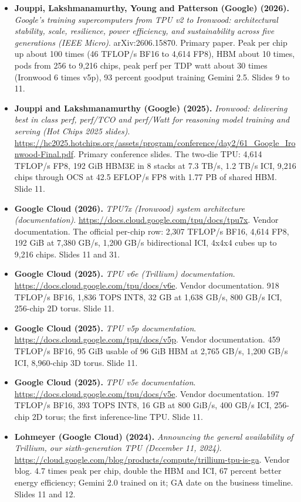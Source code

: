 \documentclass[11pt,letterpaper]{article}
\begin{document}
\begin{itemize}[leftmargin=1.2em,itemsep=3pt]
\item \textbf{Jouppi, Lakshmanamurthy, Young and Patterson (Google) (2026).} \textit{Google's training supercomputers from TPU v2 to Ironwood: architectural stability, scale, resilience, power efficiency, and sustainability across five generations (IEEE Micro)}. arXiv:2606.15870. Primary paper. Peak per chip up about 100 times (46 TFLOP/s BF16 to 4,614 FP8), HBM about 10 times, pods from 256 to 9,216 chips, peak perf per TDP watt about 30 times (Ironwood 6 times v5p), 93 percent goodput training Gemini 2.5. Slides 9 to 11.
\item \textbf{Jouppi and Lakshmanamurthy (Google) (2025).} \textit{Ironwood: delivering best in class perf, perf/TCO and perf/Watt for reasoning model training and serving (Hot Chips 2025 slides)}. \url{https://hc2025.hotchips.org/assets/program/conference/day2/61_Google_Ironwood-Final.pdf}. Primary conference slides. The two-die TPU: 4,614 TFLOP/s FP8, 192 GiB HBM3E in 8 stacks at 7.3 TB/s, 1.2 TB/s ICI, 9,216 chips through OCS at 42.5 EFLOP/s FP8 with 1.77 PB of shared HBM. Slide 11.
\item \textbf{Google Cloud (2026).} \textit{TPU7x (Ironwood) system architecture (documentation)}. \url{https://docs.cloud.google.com/tpu/docs/tpu7x}. Vendor documentation. The official per-chip row: 2,307 TFLOP/s BF16, 4,614 FP8, 192 GiB at 7,380 GB/s, 1,200 GB/s bidirectional ICI, 4x4x4 cubes up to 9,216 chips. Slides 11 and 31.
\item \textbf{Google Cloud (2025).} \textit{TPU v6e (Trillium) documentation}. \url{https://docs.cloud.google.com/tpu/docs/v6e}. Vendor documentation. 918 TFLOP/s BF16, 1,836 TOPS INT8, 32 GB at 1,638 GB/s, 800 GB/s ICI, 256-chip 2D torus. Slide 11.
\item \textbf{Google Cloud (2025).} \textit{TPU v5p documentation}. \url{https://docs.cloud.google.com/tpu/docs/v5p}. Vendor documentation. 459 TFLOP/s BF16, 95 GiB usable of 96 GiB HBM at 2,765 GB/s, 1,200 GB/s ICI, 8,960-chip 3D torus. Slide 11.
\item \textbf{Google Cloud (2025).} \textit{TPU v5e documentation}. \url{https://docs.cloud.google.com/tpu/docs/v5e}. Vendor documentation. 197 TFLOP/s BF16, 393 TOPS INT8, 16 GB at 800 GiB/s, 400 GB/s ICI, 256-chip 2D torus; the first inference-line TPU. Slide 11.
\item \textbf{Lohmeyer (Google Cloud) (2024).} \textit{Announcing the general availability of Trillium, our sixth-generation TPU (December 11, 2024)}. \url{https://cloud.google.com/blog/products/compute/trillium-tpu-is-ga}. Vendor blog. 4.7 times peak per chip, double the HBM and ICI, 67 percent better energy efficiency; Gemini 2.0 trained on it; GA date on the business timeline. Slides 11 and 12.

\end{itemize}
\end{document}
